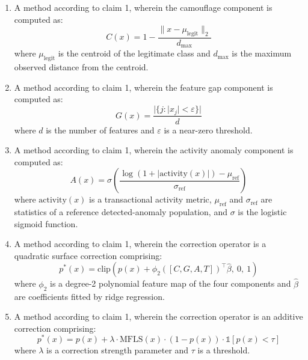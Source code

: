 \documentclass[12pt,a4paper]{article}
\begin{document}
\begin{enumerate}[label=\textbf{\arabic*.}]
\begin{enumerate}[label=(\alph*)]
\item a weighting module configured to compute component weights by one or 
more of mutual information, Fisher variance ratio, Bayesian online updating, 
or gradient-based optimisation;

\item an aggregation module configured to compute a composite blind-spot 
score from the weighted components; and

\item a correction module configured to apply one or more correction 
operators to predicted probabilities output by the deployed model, based on 
the computed component values, to produce corrected probabilities;
\end{enumerate}
wherein the system operates on a frozen deployed model without requiring 
modification or retraining of the deployed model.

\item A method according to claim 1, wherein the camouflage component is 
computed as:
\[
C(x) = 1 - \frac{\|x - \mu_{\text{legit}}\|_2}{d_{\max}}
\]
where $\mu_{\text{legit}}$ is the centroid of the legitimate class and 
$d_{\max}$ is the maximum observed distance from the centroid.

\item A method according to claim 1, wherein the feature gap component is 
computed as:
\[
G(x) = \frac{|\{j : |x_j| < \varepsilon\}|}{d}
\]
where $d$ is the number of features and $\varepsilon$ is a near-zero 
threshold.

\item A method according to claim 1, wherein the activity anomaly component 
is computed as:
\[
A(x) = \sigma\left(\frac{\log(1 + |\text{activity}(x)|) - 
\mu_{\text{ref}}}{\sigma_{\text{ref}}}\right)
\]
where $\text{activity}(x)$ is a transactional activity metric, 
$\mu_{\text{ref}}$ and $\sigma_{\text{ref}}$ are statistics of a reference 
detected-anomaly population, and $\sigma$ is the logistic sigmoid function.

\item A method according to claim 1, wherein the correction operator is a 
quadratic surface correction comprising:
\[
p^*(x) = \text{clip}\left(p(x) + \phi_2([C, G, A, T])^\top 
\hat{\beta}, \ 0, \ 1\right)
\]
where $\phi_2$ is a degree-2 polynomial feature map of the four components 
and $\hat{\beta}$ are coefficients fitted by ridge regression.

\item A method according to claim 1, wherein the correction operator is an 
additive correction comprising:
\[
p^*(x) = p(x) + \lambda \cdot \text{MFLS}(x) \cdot (1 - p(x)) \cdot 
\mathbb{1}[p(x) < \tau]
\]
where $\lambda$ is a correction strength parameter and $\tau$ is a 
threshold.


\end{enumerate}
\end{document}

